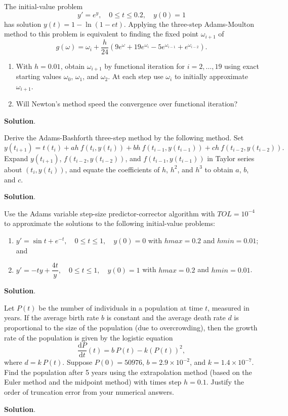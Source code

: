 \documentclass[11pt]{article}
\theoremstyle{break}
\newcommand{\dd}{\text{d}}
\numberwithin{equation}{theorem}
\begin{document}
\newpage
\begin{problem}\label{problem 11} %
    The initial-value problem $$y'=e^y, \quad 0\leq t\leq 0.2, \quad y(0)=1$$ has solution $y(t)=1-\ln(1-et)$. Applying the three-step Adams-Moulton method to this problem is equivalent to finding the fixed point $\omega_{i+1}$ of $$g(\omega)=\omega_i+\dfrac{h}{24}\left(9e^\omega+19e^{\omega_i}-5e^{\omega_{i-1}}+e^{\omega_{i-2}}\right).$$
    \begin{enumerate}
        \item With $h = 0.01$, obtain $\omega_{i+1}$ by functional iteration for $i = 2, \dots , 19$ using exact starting values $\omega_0$, $\omega_1$, and $\omega_2$. At each step use $\omega_i$ to initially approximate $\omega_{i+1}$.
        \item Will Newton's method speed the convergence over functional iteration?
    \end{enumerate}
\end{problem}
\textbf{Solution}. 


\newpage
\begin{problem}\label{problem 12} %
    Derive the Adams-Bashforth three-step method by the following method. Set $$y(t_{i+1})=t(t_i)+ah\:f(t_i, y(t_i))+bh\:f(t_{i-1}, y(t_{i-1}))+ch\:f(t_{i-2}, y(t_{i-2})).$$ Expand $y(t_{i+1})$, $f(t_{i-2}, y(t_{i-2}))$, and $f(t_{i-1}, y(t_{i-1}))$ in Taylor series about $(t_i, y(t_i))$, and equate the coefficients of $h$, $h^2$, and $h^3$ to obtain $a$, $b$, and $c$.
\end{problem}
\textbf{Solution}. 


\newpage
\begin{problem}\label{problem 13} %
    Use the Adams variable step-size predictor-corrector algorithm with $TOL = 10^{-4}$ to approximate the solutions to the following initial-value problems:
    \begin{enumerate}
        \item $y'=\sin t+e^{-t}, \quad 0\leq t\leq 1, \quad y(0)=0$ with $hmax=0.2$ and $hmin=0.01$; and
        \item $y'=-ty+\dfrac{4t}{y}, \quad 0\leq t\leq 1, \quad y(0)=1$ with $hmax=0.2$ and $hmin=0.01$.
    \end{enumerate}
\end{problem}
\textbf{Solution}. 


\newpage
\begin{problem}\label{problem 14} %
    Let $P(t)$ be the number of individuals in a population at time $t$, measured in years. If the average birth rate $b$ is constant and the average death rate $d$ is proportional to the size of the population (due to overcrowding), then the growth rate of the population is given by the logistic equation $$\dfrac{\dd P}{\dd t}(t)=b\:P(t)-k(P(t))^2,$$ where $d=k\:P(t)$. Suppose $P(0)=50976$, $b=2.9\times10^{-2}$, and $k=1.4\times 10^{-7}$. Find the population after 5 years using the extrapolation method (based on the Euler method and the midpoint method) with times step $h=0.1$. Justify the order of truncation error from your numerical answers.
\end{problem}
\textbf{Solution}. 
\end{document}

